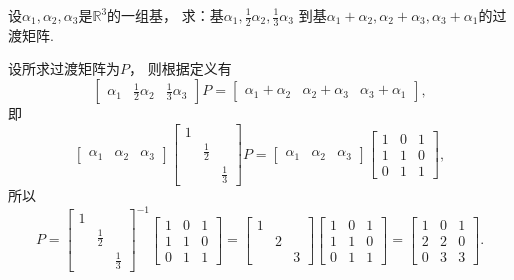 \begin{example}
设\(\alpha_1,\alpha_2,\alpha_3\)是\(\mathbb{R}^3\)的一组基，
求：基\(\alpha_1,\frac12\alpha_2,\frac13\alpha_3\)
到基\(\alpha_1+\alpha_2,\alpha_2+\alpha_3,\alpha_3+\alpha_1\)的过渡矩阵.
\begin{solution}
设所求过渡矩阵为\(P\)，
则根据定义有\[
	\begin{bmatrix}
		\alpha_1 & \frac12\alpha_2 & \frac13\alpha_3
	\end{bmatrix} P
	= \begin{bmatrix}
		\alpha_1+\alpha_2 & \alpha_2+\alpha_3 & \alpha_3+\alpha_1
	\end{bmatrix},
\]
即\[
	\begin{bmatrix}
		\alpha_1 & \alpha_2 & \alpha_3
	\end{bmatrix}
	\begin{bmatrix}
		1 \\
		& \frac12 \\
		&& \frac13
	\end{bmatrix} P
	= \begin{bmatrix}
	\alpha_1 & \alpha_2 & \alpha_3
	\end{bmatrix}
	\begin{bmatrix}
		1 & 0 & 1 \\
		1 & 1 & 0 \\
		0 & 1 & 1
	\end{bmatrix},
\]
所以\[
	P = \begin{bmatrix}
		1 \\
		& \frac12 \\
		&& \frac13
	\end{bmatrix}^{-1}
	\begin{bmatrix}
		1 & 0 & 1 \\
		1 & 1 & 0 \\
		0 & 1 & 1
	\end{bmatrix}
	= \begin{bmatrix}
		1 \\
		& 2 \\
		&& 3
	\end{bmatrix} \begin{bmatrix}
		1 & 0 & 1 \\
		1 & 1 & 0 \\
		0 & 1 & 1
	\end{bmatrix}
	= \begin{bmatrix}
		1 & 0 & 1 \\
		2 & 2 & 0 \\
		0 & 3 & 3
	\end{bmatrix}.
\]
\end{solution}
\end{example}

